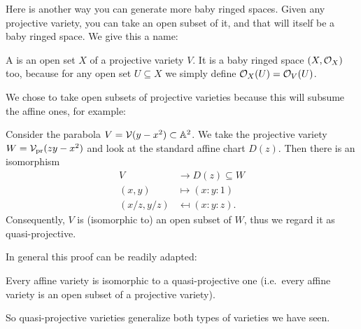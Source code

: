 Here is another way you can generate more baby ringed spaces.
Given any projective variety,
you can take an open subset of it,
and that will itself be a baby ringed space.
We give this a name:
\begin{definition}
	A  is
	an open set $X$ of a projective variety $V$.
	It is a baby ringed space $(X, \mathcal O_X)$ too,
	because for any open set $U \subseteq X$
	we simply define $\mathcal O_X(U) = \mathcal O_V(U)$.
\end{definition}

We chose to take open subsets of projective varieties
because this will subsume the affine ones, for example:
\begin{example}
	Consider the parabola $V = \mathcal V(y-x^2) \subset \mathbb A^2$.
	We take the projective variety $W = \mathcal V_{\text{pr}}(zy-x^2)$
	and look at the standard affine chart $D(z)$.
	Then there is an isomorphism
	\begin{align*}
		V &\to D(z) \subseteq W \\
		(x,y) &\mapsto (x:y:1) \\
		(x/z, y/z) &\mapsfrom (x:y:z).
	\end{align*}
	Consequently, $V$ is (isomorphic to)
	an open subset of $W$, thus we regard it as quasi-projective.
\end{example}


In general this proof can be readily adapted:
\begin{proposition}
	Every affine variety is isomorphic to a quasi-projective one
	(i.e.\ every affine variety is an open subset of a projective variety).
\end{proposition}
So quasi-projective varieties generalize both types of varieties we have seen.

%
%

